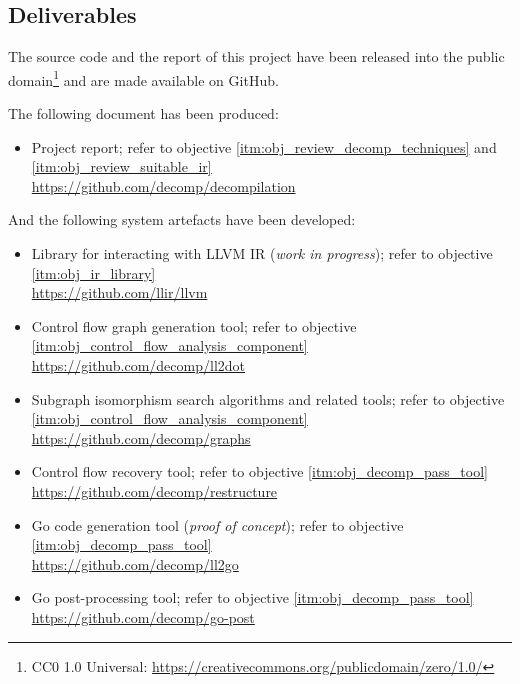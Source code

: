 
\subsection{Deliverables}
\label{sec:intro_deliverables}

The source code and the report of this project have been released into the public domain\footnote{CC0 1.0 Universal: \url{https://creativecommons.org/publicdomain/zero/1.0/}} and are made available on GitHub.

The following document has been produced:

\begin{itemize}
	\item Project report; refer to objective \ref{itm:obj_review_decomp_techniques} and \ref{itm:obj_review_suitable_ir} \\ \url{https://github.com/decomp/decompilation}
\end{itemize}

And the following system artefacts have been developed:

\begin{itemize}
	\item Library for interacting with LLVM IR (\textit{work in progress}); refer to objective \ref{itm:obj_ir_library} \\ \url{https://github.com/llir/llvm}
	\item Control flow graph generation tool; refer to objective \ref{itm:obj_control_flow_analysis_component} \\ \url{https://github.com/decomp/ll2dot}
	\item Subgraph isomorphism search algorithms and related tools; refer to objective \ref{itm:obj_control_flow_analysis_component} \\ \url{https://github.com/decomp/graphs}
	\item Control flow recovery tool; refer to objective \ref{itm:obj_decomp_pass_tool} \\ \url{https://github.com/decomp/restructure}
	\item Go code generation tool (\textit{proof of concept}); refer to objective \ref{itm:obj_decomp_pass_tool} \\ \url{https://github.com/decomp/ll2go}
	\item Go post-processing tool; refer to objective \ref{itm:obj_decomp_pass_tool} \\ \url{https://github.com/decomp/go-post}
\end{itemize}
